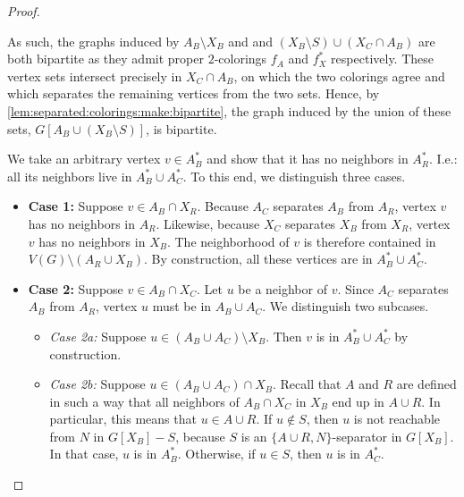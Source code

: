 \begin{proof}
\begin{claimproof}
		As such, the graphs induced by $A_B \setminus X_B$ and and $(X_B \setminus S) \cup (X_C \cap A_B)$ are both bipartite as they admit proper $2$-colorings $f_A$ and $f_X^\ast$ respectively. These vertex sets intersect precisely in $X_C \cap A_B$, on which the two colorings agree and which separates the remaining vertices from the two sets. Hence, by \cref{lem:separated:colorings:make:bipartite}, the graph induced by the union of these sets, $G[A_B \cup (X_B \setminus S)]$, is bipartite.
	\end{claimproof}
	 We take an arbitrary vertex $v \in A_B^\ast$ and show that it has no neighbors in $A_R^\ast$. I.e.: all its neighbors live in $A_B^\ast \cup A_C^\ast$. To this end, we distinguish three cases.
	\begin{itemize}
		\item \textbf{Case 1:} Suppose $v \in A_B \cap X_R$. Because $A_C$ separates $A_B$ from $A_R$, vertex $v$ has no neighbors in $A_R$. Likewise, because $X_C$ separates $X_B$ from $X_R$, vertex $v$ has no neighbors in $X_B$. The neighborhood of $v$ is therefore contained in $V(G) \setminus (A_R \cup X_B)$. By construction, all these vertices are in $A_B^\ast \cup A_C^\ast$.
		
		\item \textbf{Case 2:} Suppose $v \in A_B \cap X_C$. Let $u$ be a neighbor of $v$. Since $A_C$ separates $A_B$ from $A_R$, vertex $u$ must be in $A_B \cup A_C$. We distinguish two subcases.
		\begin{itemize}
			\item \emph{Case 2a:} Suppose $u \in (A_B \cup A_C) \setminus X_B$. Then $v$ is in $A_B^\ast \cup A_C^\ast$ by construction.
			\item \emph{Case 2b:} Suppose $u \in (A_B \cup A_C) \cap X_B$. Recall that $A$ and $R$ are defined in such a way that all neighbors of $A_B \cap X_C$ in $X_B$ end up in $A \cup R$. In particular, this means that $u \in A \cup R$. If $u \notin S$, then $u$ is not reachable from $N$ in $G[X_B] - S$, because $S$ is an $\{A \cup R, N\}$-separator in $G[X_B]$. In that case, $u$ is in $A_B^\ast$. Otherwise, if $u \in S$, then $u$ is in $A_C^\ast$.
		\end{itemize}
		

\end{itemize}
\end{proof}
